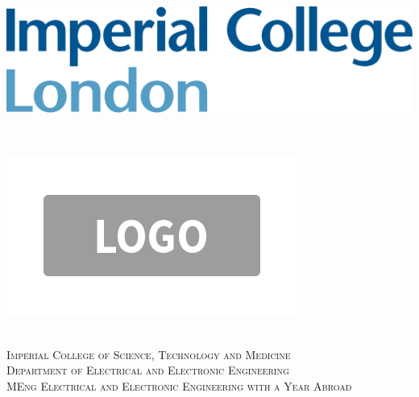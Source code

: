 \documentclass[12pt]{article}
\begin{document}
\begin{titlepage}

\newcommand{\HRule}{\rule{\linewidth}{0.5mm}} %
\setlength{\topmargin}{0in}
\center %
 
 
 \begin{minipage}{0.4\textwidth}
\begin{flushleft} \large
\hspace*{-0.5cm}
\includegraphics[scale=0.14]{imperial.png}\\
\end{flushleft}
\end{minipage}
~
\begin{minipage}{0.5\textwidth}
\begin{flushright} \large
\hspace*{2cm}
\includegraphics[scale=0.4]{company.png}\\
\end{flushright}
\end{minipage}\\[1cm]

\textsc{\LARGE Imperial College of Science, Technology and Medicine}\\[1.5cm] %
\textsc{\Large Department of Electrical and Electronic Engineering}\\[0.5cm] %
\textsc{\large MEng Electrical and Electronic Engineering with a Year Abroad}\\[0.5cm] %


\end{titlepage}
\end{document}
